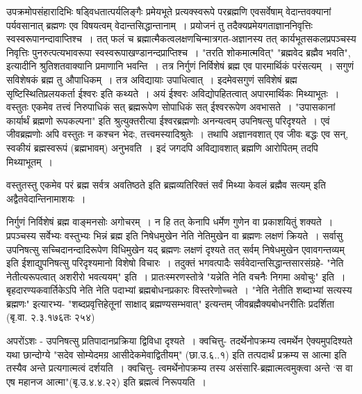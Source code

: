 {उपक्रमोपसंहारादिभिः षड्विधतात्पर्यलिङ्गैः प्रमेयभूते प्रत्यक्स्वरूपे परब्रह्मणि एव\break सर्वेषाम् वेदान्तवक्यानां पर्यवसानात् ब्रह्मणः एव विषयत्वम् वेदान्तसिद्धान्तानाम्~। प्रयोजनं तु तदैक्यप्रमेयगताज्ञाननिवृत्तिः स्वस्वरूपानन्दावाप्तिश्च~। तत् फलं च ब्रह्मात्मैकत्वलक्षण\-चिन्मात्रगत-अज्ञानस्य तत् कार्यभूतसकलप्रपञ्चस्य निवृत्तिः पुनरुत्पत्यभावरूपा स्वस्वरूपा\-खण्डानन्दप्राप्तिश्च~। "तरति शोकमात्मवित्" "ब्रह्मवेद ब्रह्मैव भवति", इत्यादीनि श्रुति\-शतवाक्यानि प्रमाणानि भवन्ति~। तत्र निर्गुणं निर्विशेषं ब्रह्म एव पारमार्थिकं परं\break सत्यम्~। सगुणं सविशेषकं ब्रह्म तु औपाधिकम्~। तत्र अविद्यायाः उपाधित्वात्~। इदमेव\break सगुणं सविशेषं ब्रह्म सृष्टिस्थितिप्रलयकर्ता ईश्वरः इति कथ्यते~। अयं ईश्वरः अविद्योपहितत्वात् अपारमार्थिकः मिथ्याभूतः~। वस्तुतः एकमेव तत्त्वं निरुपाधिकं सत् ब्रह्मरूपेण सोपाधिकं सत् ईश्वररूपेण अवभासते~। "उपासकानां कार्यार्थं ब्रह्मणो रूपकल्पना" इति श्रुत्युक्तरीत्या ईश्वरब्रह्मणोः अनन्यत्वम् उपनिषत्सु परिदृश्यते~। एवं जीवब्रह्मणोः अपि वस्तुतः न कश्चन भेदः, तत्त्वमस्यादिश्रुतेः~। तथापि अज्ञानवशात् एव जीवः बद्धः एव सन्, स्वकीयं ब्रह्मस्वरूपं (ब्रह्मभावम्) अनुभवति~। इदं जगदपि अविद्यावशात् ब्रह्मणि आरोपितम् तदपि मिथ्याभूतम्~। 

वस्तुतस्तु एकमेव परं ब्रह्म सर्वत्र अवतिष्ठते इति ब्रह्मव्यतिरिक्तं सर्वं मिथ्या केवलं ब्रह्मैव सत्यम् इति अद्वैतवेदान्तिनामाशयः~। 

निर्गुणं निर्विशेषं ब्रह्म वाङ्मनसोः अगोचरम्~। न हि तत् केनापि धर्मेण गुणेन वा प्रकाशयितुं शक्यते~। प्रपञ्चस्य सर्वेभ्यः वस्तुभ्यः भिन्नं ब्रह्म इति निषेधमुखेन नेति नेतिमुखेन वा ब्रह्मणः लक्षणं क्रियते~। सर्वासु उपनिषत्सु सच्चिदानन्दादिरूपेण विधिमुखेन यद् ब्रह्मणः लक्षणं दृश्यते तत् सर्वम् निषेधमुखेन एवावगन्तव्यम् इति ईशाद्युपनिषत्सु परिदृश्यमानो विशेषो विचारः~। तदुक्तं भगवत्पादैः सर्ववेदान्तसिद्धान्तसारसंग्रहे- "नेति नेतीत्यरूपत्वात् अशरीरो भवत्ययम्" इति~। प्रातःस्मरणस्तोत्रे "यन्नेति नेति वचनैः निगमा अवोचुः" इति~। बृहदारण्यकवार्तिकेऽपि नेति नेति पदाभ्यां ब्रह्मबोधनप्रकारः विस्तरेणोच्चते~। "नेति नेतीति शब्दाभ्यां सत्यस्य ब्रह्मणः" इत्यारभ्य- "शब्दप्रवृत्तिहेतूनां साक्षाद् ब्रह्मण्यसम्भवात्" इत्यन्तम् जीवब्रह्मैक्यबोधनरीतिः प्रदर्शिता (बृ.वा. २.३.१७६तः २५४)

अपरोंऽशः - उपनिषत्सु प्रतिपादानप्रक्रिया द्विविधा दृश्यते~। क्वचित्तु- तदर्थेनोपक्रम्य त्वमर्थेन ऐक्यमुपदिश्यते यथा छान्दोग्ये "सदेव सोम्येदमग्र आसीदेकमेवाद्वितीयम्" (छा.उ.६..१) इति तत्पदार्थं प्रक्रम्य स आत्मा इति तस्यैव अन्ते प्रत्यगात्मत्वं दर्शयति~। क्वचित्तु- त्वमर्थेनोपक्रम्य तस्य असंसारि-ब्रह्मात्मत्वमुक्त्वा अन्ते ‘स वा एष महानज आत्मा"(बृ.उ.४.४.२२) इति ब्रह्मत्वं निरूपयति~। 

}
